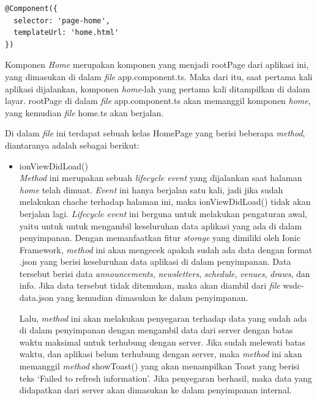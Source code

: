 \begin{itemize}
\begin{lstlisting}[language=html, label={lst:componenthome}, caption=@Component pada home.ts]
@Component({
  selector: 'page-home',
  templateUrl: 'home.html'
})
\end{lstlisting}	
	
	Komponen \textit{Home} merupakan komponen yang menjadi rootPage dari aplikasi ini, yang dimasukan di dalam \textit{file} app.component.ts. Maka dari itu, saat pertama kali aplikasi dijalankan, komponen \textit{home}-lah yang pertama kali ditampilkan di dalam layar. rootPage di dalam \textit{file} app.component.ts akan memanggil komponen \textit{home}, yang kemudian \textit{file} home.ts akan berjalan. 
	
	Di dalam \textit{file} ini terdapat sebuah kelas HomePage yang berisi beberapa \textit{method}, diantaranya adalah sebagai berikut:
	
	\begin{itemize}
		\item ionViewDidLoad() \\
		\textit{Method} ini merupakan sebuah \textit{lifecycle event} yang dijalankan saat halaman \textit{home} telah dimuat. \textit{Event} ini hanya berjalan satu kali, jadi jika sudah melakukan chache terhadap halaman ini, maka ionViewDidLoad() tidak akan berjalan lagi. \textit{Lifecycle event} ini berguna untuk melakukan pengaturan awal, yaitu untuk untuk mengambil keseluruhan data aplikasi yang ada di dalam penyimpanan. Dengan memanfaatkan fitur \textit{storage} yang dimiliki oleh Ionic Framework, \textit{method} ini akan mengecek apakah sudah ada data dengan format .json yang berisi keseluruhan data aplikasi di dalam penyimpanan. Data tersebut berisi data \textit{announcements}, \textit{newsletters}, \textit{schedule}, \textit{venues}, \textit{draws}, dan info. Jika data tersebut tidak ditemukan, maka akan diambil dari \textit{file} wsdc-data.json yang kemudian dimasukan ke dalam penyimpanan.

		Lalu, \textit{method} ini akan melakukan penyegaran terhadap data yang sudah ada di dalam penyimpanan dengan mengambil data dari server dengan batas waktu maksimal untuk terhubung dengan server. Jika sudah melewati batas waktu, dan aplikasi belum terhubung dengan server, maka \textit{method} ini akan memanggil \textit{method} showToast() yang akan menampilkan Toast yang berisi teks `Failed to refresh information'. Jika penyegaran berhasil, maka data yang didapatkan dari server akan dimasukan ke dalam penyimpanan internal.
	

\end{itemize}
\end{itemize}
